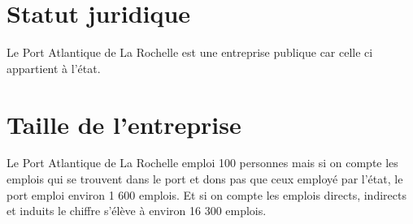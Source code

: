 \section{Statut juridique}
Le Port Atlantique de La Rochelle est une entreprise publique car celle ci appartient à l'état.

\section{Taille de l'entreprise}
Le Port Atlantique de La Rochelle emploi 100 personnes mais si on compte les emplois 
qui se trouvent dans le port et dons pas que ceux employé par l'état,
le port emploi environ 1 600 emplois.
Et si on compte les emplois directs, indirects et induits le chiffre s'élève à environ 16 300 emplois.


